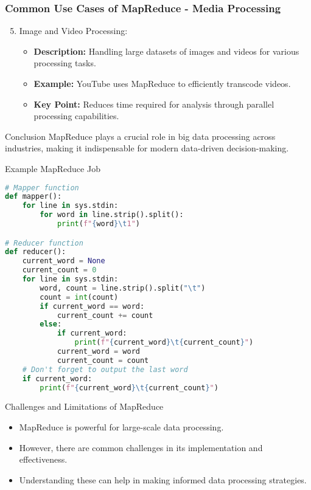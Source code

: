 \documentclass[aspectratio=169]{beamer}
\begin{document}
\begin{frame}[fragile]
    \frametitle{Common Use Cases of MapReduce - Media Processing}
    \begin{enumerate}
        \setcounter{enumi}{4}
        \item Image and Video Processing:
        \begin{itemize}
            \item \textbf{Description:} Handling large datasets of images and videos for various processing tasks.
            \item \textbf{Example:} YouTube uses MapReduce to efficiently transcode videos.
            \item \textbf{Key Point:} Reduces time required for analysis through parallel processing capabilities.
        \end{itemize}
    \end{enumerate}
    
    \begin{block}{Conclusion}
        MapReduce plays a crucial role in big data processing across industries, making it indispensable for modern data-driven decision-making.
    \end{block}
\end{frame}

\begin{frame}[fragile]{Example MapReduce Job}
\begin{lstlisting}[language=Python]
# Mapper function
def mapper():
    for line in sys.stdin:
        for word in line.strip().split():
            print(f"{word}\t1")

# Reducer function
def reducer():
    current_word = None
    current_count = 0
    for line in sys.stdin:
        word, count = line.strip().split("\t")
        count = int(count)
        if current_word == word:
            current_count += count
        else:
            if current_word:
                print(f"{current_word}\t{current_count}")
            current_word = word
            current_count = count
    # Don't forget to output the last word
    if current_word:
        print(f"{current_word}\t{current_count}")
\end{lstlisting}
\end{frame}

\begin{frame}{Challenges and Limitations of MapReduce}
    \begin{itemize}
        \item MapReduce is powerful for large-scale data processing.
        \item However, there are common challenges in its implementation and effectiveness.
        \item Understanding these can help in making informed data processing strategies.
    \end{itemize}
\end{frame}
\end{document}
